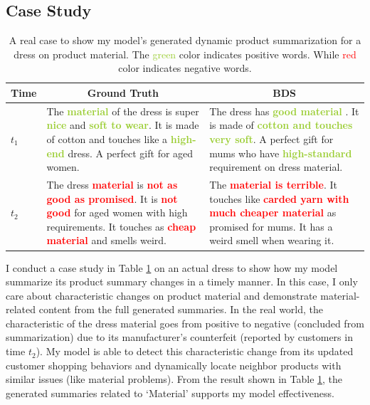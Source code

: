 \subsection{Case Study} 
\begin{table}%
	\centering
	
	
	\begin{tabular}{|p{1cm}|p{6cm}|p{6cm}|} 
		\hline
		
		\textbf{Time} & \multicolumn{1}{c|}{\textbf{Ground Truth}} & \multicolumn{1}{c|}{\textbf{BDS}}\\ \hline
		$t_1$ & The \textcolor{YellowGreen}{\textbf{material}} of the dress is super \textcolor{YellowGreen}{\textbf{nice}} and  \textcolor{YellowGreen}{\textbf{soft to wear}}. It is made of cotton and touches like a   \textcolor{YellowGreen}{\textbf{high-end}} dress. A perfect gift for aged women. &The dress has \textcolor{YellowGreen}{\textbf{good material }}. It is made of \textcolor{YellowGreen}{\textbf{cotton and touches very soft}}. A perfect gift for mums who have \textcolor{YellowGreen}{\textbf{high-standard}} requirement on dress material.\\ \hline
		$t_2$ &The dress \textcolor{red}{\textbf{material}} is \textcolor{red}{\textbf{not as good as promised}}. It is \textcolor{red}{\textbf{not good}} for aged women with high requirements. It touches as \textcolor{red}{\textbf{cheap material}} and smells weird. & The \textcolor{red}{\textbf{material is terrible}}. It touches like \textcolor{red}{\textbf{carded yarn with much cheaper material}} as promised for mums. It has a weird smell when wearing it. \\ \hline
	\end{tabular}   
	\caption{A real case to show my model's generated dynamic product summarization for a dress on product material. The \textcolor{YellowGreen}{green} color indicates positive words. While \textcolor{red}{red} color indicates negative words.}
	
	\label{tab:c5_demo} 
\end{table} 
I conduct a case study in Table \ref{tab:c5_demo} on an actual dress to show how my model summarize its product summary changes in a timely manner. In this case, I only care about characteristic changes on product material and demonstrate material-related content from the full generated summaries. In the real world, the characteristic of the dress material goes from positive to negative (concluded from summarization) due to its manufacturer's counterfeit (reported by customers in time $t_2$). My model is able to  detect this characteristic change from its updated customer shopping behaviors and dynamically locate neighbor products with similar issues (like material problems). From the result shown in Table \ref{tab:c5_demo}, the generated summaries related to `Material' supports my model effectiveness.  
